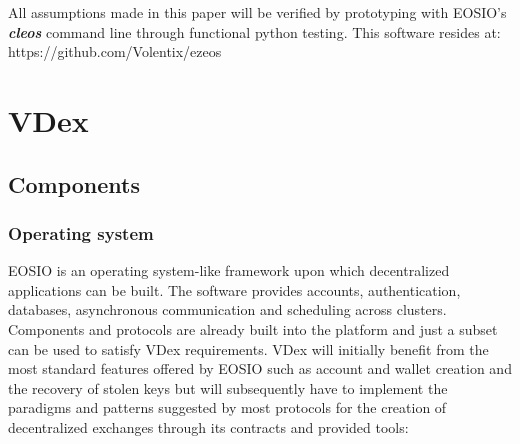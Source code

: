 \documentclass[]{article}
\begin{document}
All assumptions made in this paper will be verified by prototyping
with EOSIO's \textbf{\textit{cleos}} command line through functional python testing. This software resides at: https://github.com/Volentix/ezeos

\section{VDex}	
	 
\subsection{Components}
	
	\subsubsection{Operating system}
	EOSIO is an operating system-like framework upon which decentralized applications can be built. The software provides accounts, authentication, databases, asynchronous communication and scheduling across clusters. 
	Components and protocols are already built into the platform and just a subset can be used to satisfy VDex requirements.
	VDex will initially benefit from the most standard features offered by EOSIO such as account and wallet creation and the recovery of stolen keys but will subsequently have to implement the paradigms and patterns suggested by most protocols for the creation of decentralized exchanges through its contracts and provided tools:\\  
\end{document}
